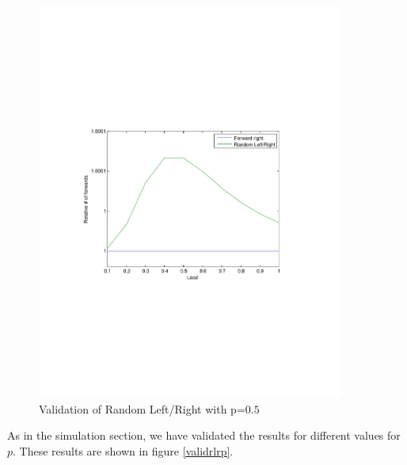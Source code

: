 \documentclass[10pt,a4paper]{article}
\begin{document}
\begin{figure}[h!tb]
\centering
\includegraphics[clip=true, trim=9em 24em 9em 24em, width=0.9\textwidth]{resources/plotrandlr.pdf}
\caption{Validation of Random Left/Right with p=$0.5$}
\label{validrlr}
\end{figure}

As in the simulation section, we have validated the results for different values for $p$. These results are shown in figure \ref{validrlrp}.
\end{document}
